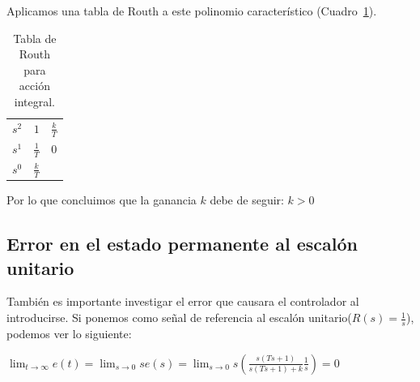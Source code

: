             Aplicamos una tabla de Routh a este polinomio característico (Cuadro~\ref{tab:AccionIntegral}).

            \begin{table}[htbp]
                \centering
                \begin{tabular}{c|c c}
                $s^2$ & $1$ & $\frac{k}{T}$ \\
                $s^1$ & $\frac{1}{T}$ & $0$ \\
                $s^0$ & $\frac{k}{T}$
                \end{tabular}
                \caption{\label{tab:AccionIntegral}Tabla de Routh para acción integral.}
            \end{table}

            Por lo que concluimos que la ganancia $k$ debe de seguir: $k>0$

        \subsection{Error en el estado permanente al escalón unitario}
            También es importante investigar el error que causara el controlador al introducirse. Si ponemos como señal de referencia al escalón unitario($R(s) = \frac{1}{s}$), podemos ver lo siguiente:

            \begin{math}
                \displaystyle \lim_{t \to \infty} e(t) = \lim_{s \to 0} s e(s) = \lim_{s \to 0} s \left(\frac{s(Ts + 1)}{s(Ts + 1) + k} \frac{1}{s}\right) = 0
            \end{math}

